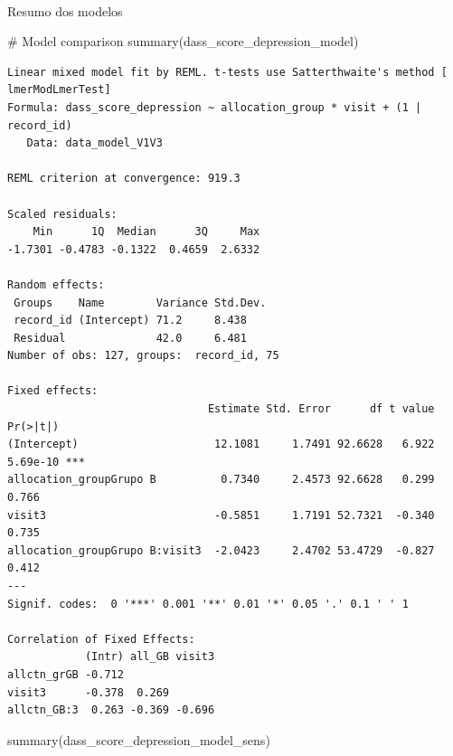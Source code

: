 \documentclass[
  letterpaper,
  DIV=11,
  numbers=noendperiod]{scrartcl}
\makeatletter
\let\oldparagraph\paragraph
\renewcommand{\paragraph}{
    \@ifstar
      \xxxParagraphStar
      \xxxParagraphNoStar
  }
\newcommand{\xxxParagraphStar}[1]{\oldparagraph*{#1}\mbox{}}
\newcommand{\xxxParagraphNoStar}[1]{\oldparagraph{#1}\mbox{}}
\newenvironment{Shaded}{\begin{snugshade}}{\end{snugshade}}
\newcommand{\CommentTok}[1]{\textcolor[rgb]{0.37,0.37,0.37}{#1}}
\newcommand{\FunctionTok}[1]{\textcolor[rgb]{0.28,0.35,0.67}{#1}}
\newcommand{\NormalTok}[1]{\textcolor[rgb]{0.00,0.23,0.31}{#1}}
\makeatother
\begin{document}
\paragraph{Resumo dos modelos}\label{resumo-dos-modelos-22}

\begin{Shaded}
\begin{Highlighting}[]
\CommentTok{\# Model comparison}
\FunctionTok{summary}\NormalTok{(dass\_score\_depression\_model)}
\end{Highlighting}
\end{Shaded}

\begin{verbatim}
Linear mixed model fit by REML. t-tests use Satterthwaite's method [
lmerModLmerTest]
Formula: dass_score_depression ~ allocation_group * visit + (1 | record_id)
   Data: data_model_V1V3

REML criterion at convergence: 919.3

Scaled residuals: 
    Min      1Q  Median      3Q     Max 
-1.7301 -0.4783 -0.1322  0.4659  2.6332 

Random effects:
 Groups    Name        Variance Std.Dev.
 record_id (Intercept) 71.2     8.438   
 Residual              42.0     6.481   
Number of obs: 127, groups:  record_id, 75

Fixed effects:
                               Estimate Std. Error      df t value Pr(>|t|)    
(Intercept)                     12.1081     1.7491 92.6628   6.922 5.69e-10 ***
allocation_groupGrupo B          0.7340     2.4573 92.6628   0.299    0.766    
visit3                          -0.5851     1.7191 52.7321  -0.340    0.735    
allocation_groupGrupo B:visit3  -2.0423     2.4702 53.4729  -0.827    0.412    
---
Signif. codes:  0 '***' 0.001 '**' 0.01 '*' 0.05 '.' 0.1 ' ' 1

Correlation of Fixed Effects:
            (Intr) all_GB visit3
allctn_grGB -0.712              
visit3      -0.378  0.269       
allctn_GB:3  0.263 -0.369 -0.696
\end{verbatim}

\begin{Shaded}
\begin{Highlighting}[]
\FunctionTok{summary}\NormalTok{(dass\_score\_depression\_model\_sens)}
\end{Highlighting}
\end{Shaded}
\end{document}
